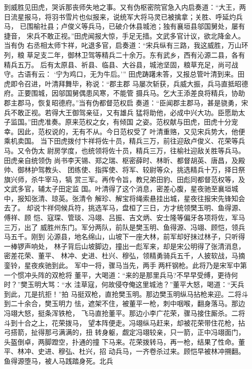 到威胜见田虎，哭诉那丧师失地之事。又有伪枢密院官急入内启奏道：“大王，两
日流星报马，将羽书雪片也似报来，说统军大将马灵已被擒拿；关胜、呼延灼兵马，
已围榆社县；卢俊义等兵马，已破介休县城池；独有襄垣县邬国舅处，屡有捷音，
宋兵不敢正视。”田虎闻报大惊，手足无措。文武多官计议，欲北降金人。当有伪
右丞相太师卞祥，叱退多官，启奏道：“宋兵纵有三路，我这威胜，万山环列，粮
草足支二年，御林卫驾等精兵二十余万。东有武乡，西有沁源二县，各有精兵五万。
后有太原县、祈县、临县、大谷县，城池坚固，粮草充足，尚可战守。古语有云：
‘宁为鸡口，无为牛后。’”
田虎踌躇未答，又报总管叶清到来。田虎即令召进，叶清拜舞毕，称说：“郡主郡
马屡次斩获，兵威大振，兵马直抵昭德府。正要围城，因邬国舅偶患风寒，不能管
摄兵马。乞大王添差良将精兵，协助郡主郡马，恢复昭德府。”当有伪都督范权启
奏道：“臣闻郡主郡马，甚是骁勇，宋兵不敢正视。若得大王御驾亲征，又有雄兵
猛将助他，必成中兴大功。臣愿助太子监国。”田虎准奏。原来范权之女，有倾国
之姿。范权献与田虎，田虎十分宠幸。因此，范权说的，无有不从。今日范权受了
叶清重赂，又见宋兵势大，他便乘机卖国。
当下田虎拨付卞祥将佐十员，精兵三万，前往迎敌卢俊义、花荣等兵马。又令伪太
尉房学度，也统领将佐十员，精兵三万，往榆社迎敌关胜等兵马。田虎亲自统领伪
尚书李天锡、郑之瑞、枢密薛时、林昕、都督胡英、唐昌，及殿帅、御林护驾教头、
团练使、指挥使、将军、较尉等众，挑选精兵十万，择日祭旗兴师，杀牛宰马，犒
赏三军。再传令旨，教兄弟田豹、田彪同都督范权等，及文武多官，辅太子田定监
国。叶清得了这个消息，密差心腹，星夜驰至襄垣城中，报知张清、琼英。张清令
解珍、解宝将绳索悬挂出城，星夜往报宋先锋知会去了。
却说卞祥伺候兵符，挑选军马，盘桓了三日，方才统领樊玉明、鱼得源、傅祥、顾
恺、寇琛、管琰、冯翊、吕振、吉文炳、安士隆等偏牙各项将佐，军马三万，出了
威胜州东门。军分两队，前队是樊玉明、鱼得源、冯翊、顾恺，领兵马五千。刚到
沁源县，地名绵山，山坡下一座大林，前军却好抹过林子，只听得一棒锣声响处，
林子背后山坡脚边，撞出一彪军来，却是宋公明得了张清消息，密差花荣、董平、
林冲、史进、杜兴、穆弘，领精勇骑兵五千，人披软战，马摘銮铃，星夜疾驰到此。
军中一将，骤马当先，两手两杆钢枪。此将乃是宋军中第一个惯冲头阵的双枪将
董平，大喝道：“来的是那里兵马?不早早受缚，更待何时？”樊玉明大骂：“水
洼草寇，何故侵夺俺这里城池？”董平大怒，喝道：“天兵到此，兀是抗拒！”拍
马挺双枪，直抢樊玉明。那边樊玉明纵马拈枪来迎。二将斗到二十余合，樊玉明力
怯，遮架不住，被董平一枪，刺中咽喉，翻身落马。那边冯翊大怒，挺条浑铁枪，
飞马直抢董平。那边小李广花荣，骤马接住厮杀。二将斗到十合之上，花荣拨马，
望本阵便走。冯翊纵马赶来，却被花荣带住花枪，拈弓搭箭，扯得那弓满满的，扭
转身躯，觑定冯翊较亲，只一箭，正中冯翊面门，头盔倒卓，两脚蹬空，扑通的撞
下马来。花荣拨转马，再一枪，结果了性命。董平、林冲、史进、穆弘、杜兴，招
动兵马，一齐卷杀过来。顾恺早被林冲搠翻。鱼得源堕马，被人马践踏身死。北兵
